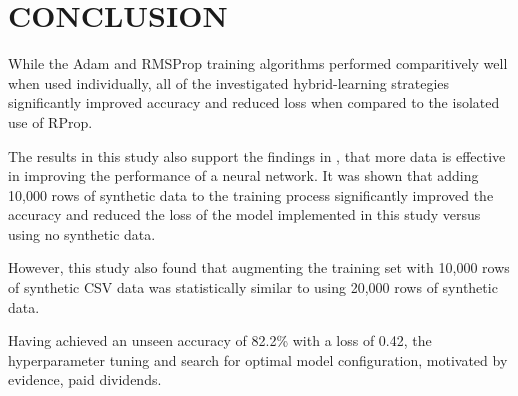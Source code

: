 \section{CONCLUSION}

While the Adam and RMSProp training algorithms performed comparitively well when used individually, all of the investigated hybrid-learning strategies 
significantly improved accuracy and reduced loss when compared to the isolated use of RProp.

The results in this study also support the findings in \cite{sun2017revisitingunreasonableeffectivenessdata}, that more data is
effective in improving the performance of a neural network. It was shown that
adding 10,000 rows of synthetic data to the training process significantly improved the accuracy and reduced the loss of the model implemented in this study
versus using no synthetic data.

However, this study also found that augmenting the training set with 
10,000 rows of synthetic CSV data was statistically similar to using 20,000 rows of synthetic data. 

Having achieved an unseen accuracy of 82.2\% with a loss of 0.42, the hyperparameter tuning and search for optimal model configuration,
motivated by evidence, paid dividends.